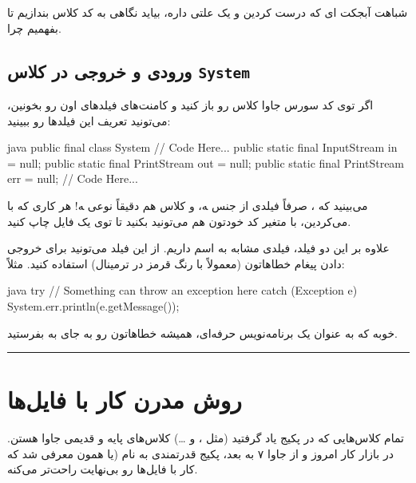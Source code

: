 شباهت آبجکت  ای که درست کردین و
 یک علتی داره، بیاید نگاهی به کد کلاس
 بندازیم تا بفهمیم چرا.

\subsection{ورودی و خروجی در کلاس \texttt{System}}

اگر توی کد سورس جاوا کلاس  رو باز کنید و کامنت‌های
فیلدهای اون رو بخونین، می‌تونید تعریف این فیلدها رو ببینید:

\begin{codebox}{java}
public final class System {
    // Code Here...
    public static final InputStream in = null;
    public static final PrintStream out = null;
    public static final PrintStream err = null;
    // Code Here...
}
\end{codebox}

می‌بینید که ، صرفاً فیلدی از جنس 
‍ه، و کلاس  هم دقیقاً نوعی  ‍ه!
هر کاری که با  می‌کردین، با متغیر
 کد خودتون هم می‌تونید بکنید تا توی یک فایل چاپ کنید.

علاوه بر این دو فیلد، فیلدی مشابه  به اسم
 داریم. از این فیلد می‌تونید برای خروجی دادن پیغام
خطاهاتون (معمولاً با رنگ قرمز در ترمینال) استفاده کنید. مثلاً:

\begin{codebox}{java}
try {
    // Something can throw an exception here
} catch (Exception e) {  
    System.err.println(e.getMessage());  
}
\end{codebox}

خوبه که به عنوان یک برنامه‌نویس حرفه‌ای، همیشه خطاهاتون رو به جای
 به  بفرستید.

\begin{center}\rule{0.5\linewidth}{0.5pt}\end{center}

\section{روش مدرن کار با فایل‌ها }

تمام کلاس‌هایی که در پکیج  یاد گرفتید (مثل
،  و \ldots) کلاس‌های پایه و
قدیمی جاوا هستن. در بازار کار امروز و از جاوا ۷ به بعد، پکیج قدرتمندی به
نام  (یا همون  معرفی شد که کار با
فایل‌ها رو بی‌نهایت راحت‌تر می‌کنه.

